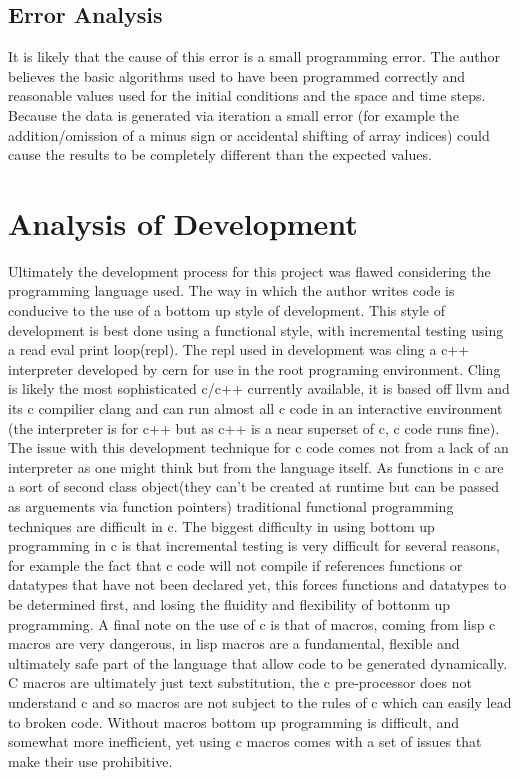 \documentclass{article}
\begin{document}
{\subsection{Error Analysis}
It is likely that the cause of this error is a small programming error. The
author believes the basic algorithms used to have been programmed correctly and
reasonable values used for the initial conditions and the space and time
steps. Because the data is generated via iteration a small error (for example
the addition/omission of a minus sign or accidental shifting of array indices)
could cause the results to be completely different than the expected values.
\section{Analysis of Development}
Ultimately the development process for this project was flawed considering the
programming language used. The way in which the author writes code is conducive
to the use of a bottom up style of development. This style of development is
best done using a functional style, with incremental testing using a read eval
print loop(repl). The repl used in development was cling a c++ interpreter
developed by cern for use in the root programing environment. Cling is likely
the most sophisticated c/c++ currently available, it is based off llvm and its
c compilier clang and can run almost all c code in an interactive environment
(the interpreter is for c++ but as c++ is a near superset of c, c code runs
fine). The issue with this development technique for c code comes not from a
lack of an interpreter as one might think but from the language itself. As
functions in c are a sort of second class object(they can't be created at
runtime but can be passed as arguements via function pointers) traditional
functional programming techniques are difficult in c. The biggest difficulty in
using bottom up programming in c is that incremental testing is very difficult
for several reasons, for example the fact that c code will not
compile if references functions or datatypes that have not been declared yet,
this forces functions and datatypes to be determined first, and losing the
fluidity and flexibility of bottonm up programming. A final note on the use of
c is that of macros, coming from lisp c macros are very dangerous, in lisp
macros are a fundamental, flexible and ultimately safe part of the language
that allow code to be generated dynamically. C macros are ultimately just text
substitution, the c pre-processor does not understand c and so macros are not
subject to the rules of c which can easily lead to broken code. Without macros
bottom up programming is difficult, and somewhat more inefficient, yet using c
macros comes with a set of issues that make their use prohibitive.

}
\end{document}
